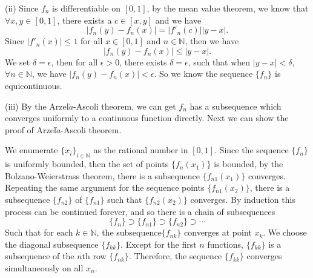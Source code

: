 \documentclass[12pt,a4paper]{ctexart}
\begin{document}
(ii) Since $f_{n}$ is differentiable on $[0, 1]$, by the mean value theorem, we know that $\forall x, y \in [0, 1]$, there exists a $c \in [x, y]$ and we have
\begin{equation*}
   |f_{n}(y) - f_{n}(x)| = |f'_{n}(c)| |y - x|.
\end{equation*}
Since $|f'_{n}(x)| \leq 1$ for all $x \in [0, 1]$ and $n \in \mathbb{N}$, then we have
\begin{equation*}
   |f_{n}(y) - f_{n}(x)| \leq |y - x|.
\end{equation*}
We set $\delta = \epsilon$, then for all $\epsilon > 0$, there exists $\delta = \epsilon$, such that when $|y - x| < \delta$, $\forall n \in \mathbb{N}$, we have $|f_{n}(y) - f_{n}(x)| < \epsilon$. So we know the sequence $\{f_{n}\}$ is equicontinuous.

(iii) By the Arzel$\grave{a}$-Ascoli theorem, we can get $f_{n}$ has a subsequence which converges uniformly to a continuous function directly. Next we can show the proof of Arzel$\grave{a}$-Ascoli theorem.

We enumerate $\{x_{i}\}_{i \in \mathbb{N}}$ as the rational number in $[0, 1]$. Since the sequence $\{f_{n}\}$ is uniformly bounded, then the set of points $\{f_{n}(x_{1})\}$ is bounded, by the Bolzano-Weierstrass theorem, there is a subsequence $\{f_{n1}(x_{1})\}$ converges. Repeating the same argument for the sequence points $\{f_{n1}(x_{2})\}$, there is a subsequence $\{f_{n2}\}$ of $\{f_{n1}\}$ such that $\{f_{n2}(x_{2})\}$ converges. By induction this process can be continued forever, and so there is a chain of subsequences
\begin{equation*}
   \{f_{n}\} \supset \{f_{n1}\} \supset \{f_{n2}\} \supset \cdots
\end{equation*}
Such that for each $k \in \mathbb{N}$, the subsequence$\{f_{nk}\}$ converges at point $x_{k}$. We choose the diagonal subsequence $\{f_{kk}\}$. Except for the first $n$ functions, $\{f_{kk}\}$ is a subsequence of the $n$th row $\{f_{nk}\}$. Therefore, the sequence $\{f_{kk}\}$ converges simultaneously on all $x_{n}$.
\end{document}
